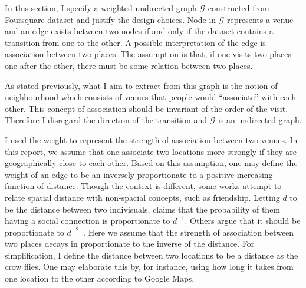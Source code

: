 In this section, I specify a weighted undirected graph $\mathcal{G}$ constructed from Foursquare dataset and justify the design choices.
Node in $\mathcal{G}$ represents a venue and an edge exists between two nodes if and only if the dataset contains a transition from one to the other.
A possible interpretation of the edge is association between two places. The assumption is that, if one visits two places one after the other, there must be some relation between two places.

As stated previously, what I aim to extract from this graph is the notion of neighbourhood which consists of venues that people would ``associate'' with each other. This concept of association should be invariant of the order of the visit. Therefore I disregard the direction of the transition and $\mathcal{G}$ is an undirected graph.

I used the weight to represent the strength of association between two venues. In this report, we assume that one associate two locations more strongly if they are geographically close to each other. Based on this assumption, one may define the weight of an edge to be an inversely proportionate to a positive increasing function of distance. 
Though the context is different, some works attempt to relate spatial distance with non-spacial concepts, such as friendship. Letting $d$ to be the distance between two indivisuals, \cite{backstrom2010find} claims that the probability of them having a social connection is proportionate to $d^{-1}$. Others argue that it should be proportionate to $d^{-2}$~\citep{lambiotte2008geographical}. Here we assume that the strength of association between two places decays in proportionate to the inverse of the distance.  For simplification, I define the distance between two locations to be a distance as the crow flies. One may elaborate this by, for instance, using how long it takes from one location to the other according to Google Maps.
